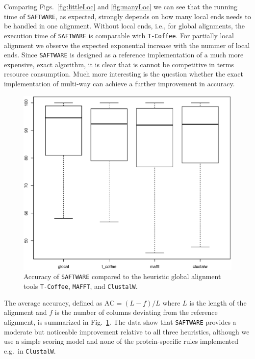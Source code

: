 \documentclass[a4paper,10pt]{article}
\newcommand{\TODO}[1]{\begingroup\color{red}#1\endgroup}
\newcommand{\PFS}[1]{\begingroup\color{green}#1\endgroup}
\newcommand{\SAFTWARE}{\TODO{\texttt{SAFTWARE}}}
\begin{document}
Comparing Figs.~\ref{fig:littleLoc} and \ref{fig:manyLoc} we can see that
the running time of \SAFTWARE, as expected, strongly depends on how many
local ends needs to be handled in one alignment. \PFS{Without local ends,
  i.e., for global alignments, the execution time of \SAFTWARE{} is
  comparable with \texttt{T-Coffee}. For partially local alignment we
  observe the expected exponential increase with the nummer of local
  ends. Since \SAFTWARE{} is designed as a reference implementation of a
  much more expensive, exact algorithm, it is clear that is cannot be
  competitive in terms resource consumption. Much more interesting is the
  question whether the exact implementation of multi-way can achieve a
  further improvement in accuracy.}

\begin{figure}
  \begin{center}
    \includegraphics[width=1\columnwidth]{ac.eps}
  \end{center}
  \label{fig:ac}
  \caption{Accuracy of \SAFTWARE{} compared to the heuristic global
    alignment tools \texttt{T-Coffee}, \texttt{MAFFT}, and
    \texttt{ClustalW}.}
\end{figure}

\PFS{The average accuracy, defined as $\mbox{AC}=(L-f)/L$ where $L$ is the
  length of the alignment and $f$ is the number of columns deviating from
  the reference alignment, is summarized in Fig.~\ref{fig:ac}. The data
  show that \SAFTWARE{} provides a moderate but noticeable improvement
  relative to all three heuristics, although we use a simple scoring model
  and none of the protein-specific rules implemented e.g.\ in
  \texttt{ClustalW}. }
\end{document}
